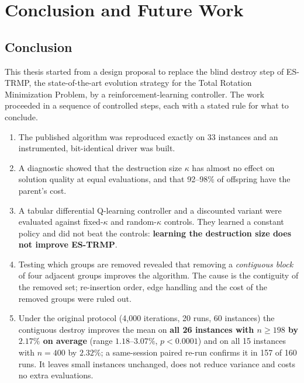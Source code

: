 
\chapter{Conclusion and Future Work} %

\label{Chapter6} %


\section{Conclusion}

This thesis started from a design proposal to replace the blind destroy step of ES-TRMP, the state-of-the-art evolution strategy for the Total Rotation Minimization Problem, by a reinforcement-learning controller. The work proceeded in a sequence of controlled steps, each with a stated rule for what to conclude.

\begin{enumerate}
\item The published algorithm was reproduced exactly on 33 instances and an instrumented, bit-identical driver was built.
\item A diagnostic showed that the destruction size $\kappa$ has almost no effect on solution quality at equal evaluations, and that 92--98\% of offspring have the parent's cost.
\item A tabular differential Q-learning controller and a discounted variant were evaluated against fixed-$\kappa$ and random-$\kappa$ controls. They learned a constant policy and did not beat the controls: \textbf{learning the destruction size does not improve ES-TRMP}.
\item Testing which groups are removed revealed that removing a \emph{contiguous block} of four adjacent groups improves the algorithm. The cause is the contiguity of the removed set; re-insertion order, edge handling and the cost of the removed groups were ruled out.
\item Under the original protocol (4{,}000 iterations, 20 runs, 60 instances) the contiguous destroy improves the mean on \textbf{all 26 instances with $n\ge198$ by $2.17\%$ on average} (range $1.18$--$3.07\%$, $p<0.0001$) and on all 15 instances with $n=400$ by $2.32\%$; a same-session paired re-run confirms it in 157 of 160 runs. It leaves small instances unchanged, does not reduce variance and costs no extra evaluations.
\end{enumerate}

